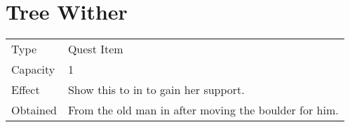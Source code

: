 \section{Tree Wither}
\label{item:tree_wither}


\noindent\begin{tabularx}{\textwidth}[l]{lX}
	Type
	& Quest Item
\\
	Capacity
	& 1
\\
	Effect
	& Show this to \nameref{char:kaeli} in \nameref{map:foresta} to gain her support.
\\
	Obtained
	& From the old man in \nameref{map:level_forest} after moving the boulder for him.
\end{tabularx}
